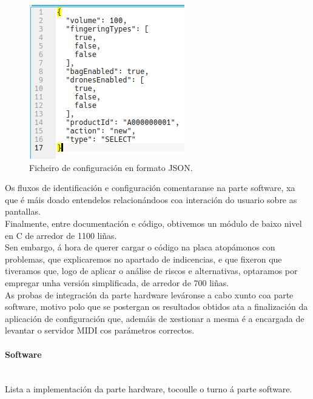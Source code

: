    \begin{figure}[htbp]
    \centering
    \includegraphics[scale=0.6, keepaspectratio=true]{./imagenes/ficheiro-json.png}
    \caption{Ficheiro de configuración en formato JSON.}
    \label{figura:FicheiroJson}
   \end{figure}
   
   Os fluxos de identificación e configuración comentaranse na parte software,
   xa que é máis doado entendelos relacionándoos coa interación do usuario sobre
   as pantallas. \\
   
   Finalmente, entre documentación e código, obtivemos un módulo de baixo nivel
   en C de arredor de 1100 liñas. \\
   
   Sen embargo, á hora de querer cargar o código na placa atopámonos con
   problemas, que explicaremos no apartado de indicencias, e que fixeron que
   tiveramos que, logo de aplicar o análise de riscos e alternativas, optaramos
   por empregar unha versión simplificada, de arredor de 700 liñas. \\
   
   As probas de integración da parte hardware leváronse a cabo xunto coa parte
   software, motivo polo que se postergan os resultados obtidos ata a
   finalización da aplicación de configuración que, ademáis de xestionar a mesma
   é a encargada de levantar o servidor MIDI cos parámetros correctos.
   
   \paragraph{Software}\mbox{}\\
   
   Lista a implementación da parte hardware, tocoulle o turno á parte
   software. \\
   
